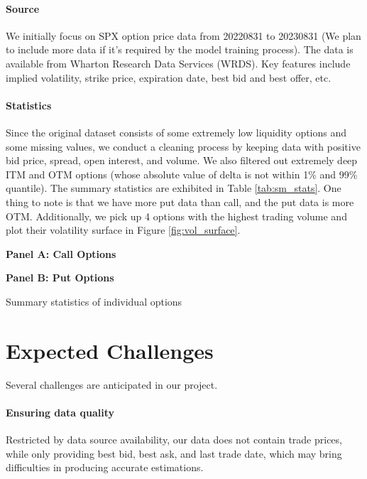 \documentclass{article}
\newcommand{\figref}[1]{Figure \ref{#1}}
\newcommand{\tabref}[1]{Table \ref{#1}}
\begin{document}
\paragraph{Source} We initially focus on SPX option price data from 20220831 to 20230831 (We plan to include more data if it's required by the model training process). The data is available from  Wharton Research Data Services (WRDS). Key features include implied volatility, strike price, expiration date, best bid and best offer, etc.
\paragraph{Statistics} Since the original dataset consists of some extremely low liquidity options and some missing values, we conduct a cleaning process by keeping data with positive bid price, spread, open interest, and volume. We also filtered out extremely deep ITM and OTM options (whose absolute value of delta is not within 1\% and 99\% quantile). The summary statistics are exhibited in \tabref{tab:sm_stats}. One thing to note is that we have more put data than call, and the put data is more OTM. Additionally, we pick up 4 options with the highest trading volume and plot their volatility surface in \figref{fig:vol_surface}.


\begin{table}[h]
    \centering
    \textbf{Panel A: Call Options}
    \resizebox{\textwidth}{!}{}
    \vspace{5pt}
    
    \textbf{Panel B: Put Options}
    \resizebox{\textwidth}{!}{}
    \vspace{5pt}
    
    \caption{Summary statistics of individual options}
    \label{tab:sm_stats}
\end{table}



\section{Expected Challenges}

Several challenges are anticipated in our project.
\paragraph{Ensuring data quality}
Restricted by data source availability, our data does not contain trade prices, while only providing best bid, best ask, and last trade date, which may bring difficulties in producing accurate estimations.
\end{document}
